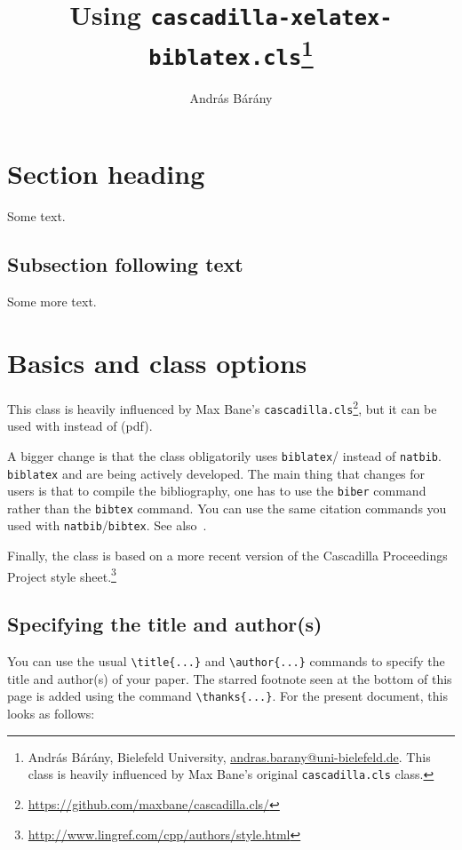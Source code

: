\documentclass{cascadilla-xelatex-biblatex}
\title{Using \texttt{cascadilla-xelatex-biblatex.cls}\thanks{András Bárány,
        Bielefeld University,
\url{andras.barany@uni-bielefeld.de}. This class is heavily influenced by Max
Bane's original \texttt{cascadilla.cls} class.}}
\author{András Bárány}
\begin{document}
\maketitle

\section{Section heading}


Some text.

\subsection{Subsection following text}


Some more text.

\section{Basics and class options}

This class is heavily influenced by Max Bane's
\texttt{cascadilla.cls}\footnote{\url{https://github.com/maxbane/cascadilla.cls/}},
but it can be used with  instead of (pdf).

A bigger change is that the class obligatorily uses
\texttt{biblatex}/ instead of \texttt{natbib}. \texttt{biblatex}
and  are being actively developed. The main thing that changes
for users is that to compile the bibliography, one has to use the
\texttt{biber} command rather than the \texttt{bibtex} command. You can use the
same citation commands you used with \texttt{natbib}/\texttt{bibtex}. See
also~.

Finally, the class is based on a more recent version of the Cascadilla
Proceedings Project style
sheet.\footnote{\url{http://www.lingref.com/cpp/authors/style.html}}

\subsection{Specifying the title and author(s)}

You can use the usual \verb+\title{...}+ and \verb+\author{...}+ commands to
specify the title and author(s) of your paper. The starred footnote seen at the
bottom of this page is added using the command \verb+\thanks{...}+. For the
present document, this looks as follows:
\end{document}
